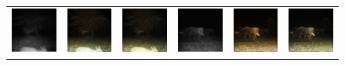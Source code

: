 \begin{figure}[htp!]
\begin{tabularx}{\textwidth}{>{\centering\arraybackslash}X >{\centering\arraybackslash}X >{\centering\arraybackslash}X >{\centering\arraybackslash}X >{\centering\arraybackslash}X >{\centering\arraybackslash}X}
        \includegraphics{gfx/conditional-with-cycle-gan-qual/nir_S2_B06_R1_PICT0387.jpg} & \includegraphics{gfx/conditional-with-cycle-gan-qual/cyclegan_S2_B06_R1_PICT0387_fake.png} & \includegraphics{gfx/conditional-with-cycle-gan-qual/diff_cycle_gan_S2_B06_R1_PICT0387_fake.png} & \includegraphics{gfx/conditional-with-cycle-gan-qual/nir_S2_B06_R3_PICT1364.jpg} & \includegraphics{gfx/conditional-with-cycle-gan-qual/cyclegan_S2_B06_R3_PICT1364_fake.png} & \includegraphics{gfx/conditional-with-cycle-gan-qual/diff_cycle_gan_S2_B06_R3_PICT1364_fake.png} \\

\end{tabularx}
\end{figure}
